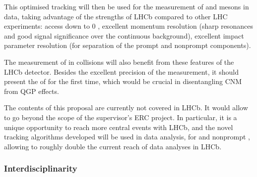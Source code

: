 \documentclass[a4paper,11pt]{article}
\newcommand{\ER}{ER}
\newcommand{\supervisor}{the supervisor}
\begin{document}
This optimised tracking will then be used for the measurement of \Dz and \Jpsi mesons in \pbpb data, taking advantage of the strengths of LHCb compared to other LHC experiments: access down to 0 \pt, excellent momentum resolution (sharp resonances and good signal significance over the continuous background), excellent impact parameter resolution (for separation of the prompt and nonprompt components).

The measurement of \PgUabc in \ppb collisions will also benefit from these features of the LHCb detector. Besides the excellent precision of the measurement, it should present the \rpa of \PgUc for the first time, which would be crucial in disentangling CNM from QGP effects.

The contents of this proposal are currently not covered in LHCb. It would allow to go beyond the scope of \supervisor's ERC project. In particular, it is a unique opportunity to reach more central \pbpb events with LHCb, and the novel tracking algorithms developed will be used in data analysis, for \Dz and nonprompt \Jpsi, allowing to roughly double the current \npart reach of data analyses in LHCb. 
% 
% 

% 

\subsubsection{Interdisciplinarity}
\end{document}
